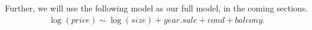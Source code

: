 Further, we will use the following model as our full model, in the coming sections.
\begin{align*}
    \log(price) \sim \log(size) + year.sale + \textit{cond} +  \textit{balcony}.
\end{align*}

